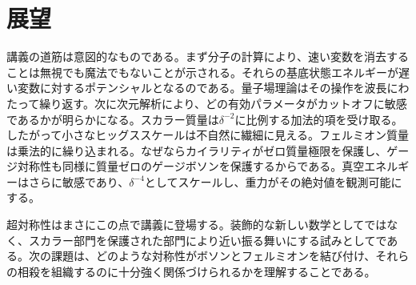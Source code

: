 \begin{classroomqa}
\end{classroomqa}

\section{展望}

講義の道筋は意図的なものである。まず分子の計算により、速い変数を消去することは無視でも魔法でもないことが示される。それらの基底状態エネルギーが遅い変数に対するポテンシャルとなるのである。量子場理論はその操作を波長にわたって繰り返す。次に次元解析により、どの有効パラメータがカットオフに敏感であるかが明らかになる。スカラー質量は\(\delta^{-2}\)に比例する加法的項を受け取る。したがって小さなヒッグススケールは不自然に繊細に見える。フェルミオン質量は乗法的に繰り込まれる。なぜならカイラリティがゼロ質量極限を保護し、ゲージ対称性も同様に質量ゼロのゲージボソンを保護するからである。真空エネルギーはさらに敏感であり、\(\delta^{-4}\)としてスケールし、重力がその絶対値を観測可能にする。

超対称性はまさにこの点で講義に登場する。装飾的な新しい数学としてではなく、スカラー部門を保護された部門により近い振る舞いにする試みとしてである。次の課題は、どのような対称性がボソンとフェルミオンを結び付け、それらの相殺を組織するのに十分強く関係づけられるかを理解することである。